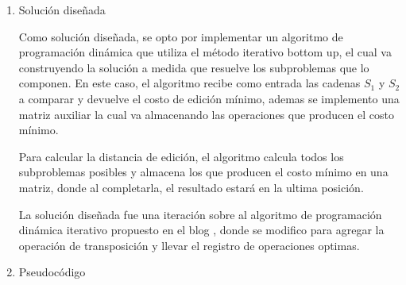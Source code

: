 

\begin{enumerate}[1)]
    \item Solución diseñada
    
Como solución diseñada, se opto por implementar un algoritmo de programación
dinámica que utiliza el método iterativo bottom up, el cual va construyendo la
solución a medida que resuelve los subproblemas que lo componen. En este caso, el
algoritmo recibe como entrada las cadenas $S_1$ y $S_2$ a comparar y devuelve el costo de edición
mínimo, ademas se implemento una matriz auxiliar la cual va almacenando las operaciones
que producen el costo mínimo.

Para calcular la distancia de edición, el algoritmo calcula todos los subproblemas posibles
y almacena los que producen el costo mínimo en una matriz, donde al completarla,
el resultado estará en la ultima posición.

La solución diseñada fue una iteración sobre al algoritmo de programación dinámica iterativo
propuesto en el 
blog \citeauthor{EditDistance} \cite{EditDistance}
, donde se modifico para agregar la operación de transposición y llevar el registro
de operaciones optimas.

\item Pseudocódigo

\begin{algorithm}[H]
    \DontPrintSemicolon
    \footnotesize
\end{algorithm}
\end{enumerate}
